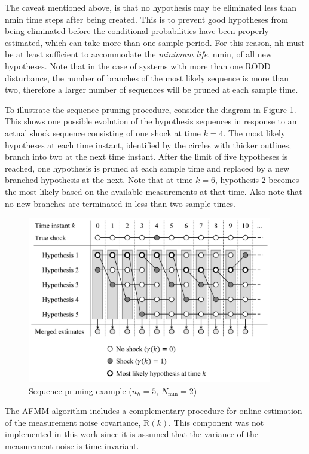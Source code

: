 The caveat mentioned above, is that no hypothesis may be eliminated less than \gls{nmin} time steps after being created. This is to prevent good hypotheses from being eliminated before the conditional probabilities have been properly estimated, which can take more than one sample period. For this reason, \gls{nh} must be at least sufficient to accommodate the \textit{minimum life}, \gls{nmin}, of all new hypotheses. Note that in the case of systems with more than one \gls{RODD} disturbance, the number of branches of the most likely sequence is more than two, therefore a larger number of sequences will be pruned at each sample time.

To illustrate the sequence pruning procedure, consider the diagram in Figure \ref{fig:mm-obs-seq-SP}. This shows one possible evolution of the hypothesis sequences in response to an actual shock sequence consisting of one shock at time $k=4$.  The most likely hypotheses at each time instant, identified by the circles with thicker outlines, branch into two at the next time instant. After the limit of five hypotheses is reached, one hypothesis is pruned at each sample time and replaced by a new branched hypothesis at the next. Note that at time $k=6$, hypothesis 2 becomes the most likely based on the available measurements at that time. Also note that no new branches are terminated in less than two sample times.
\begin{figure}[ht]
	\centering
	\includegraphics[width=10.7cm]{images/mm_obs_seq_SP.pdf}
	\caption{Sequence pruning example ($n_h=5$, $N_\text{min}=2$)}
	\label{fig:mm-obs-seq-SP}
\end{figure}

The \gls{AFMM} algorithm includes a complementary procedure for online estimation of the measurement noise covariance, $\mathrm{R}(k)$. This component was not implemented in this work since it is assumed that the variance of the measurement noise is time-invariant.


